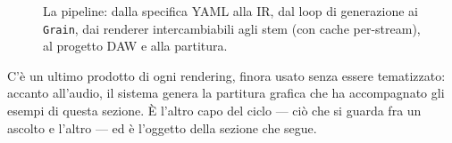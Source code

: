 \begin{figure}[t]
  \centering
  
\caption{La pipeline: dalla specifica YAML alla IR, dal
    loop di generazione ai \texttt{Grain}, dai renderer intercambiabili
    agli stem (con cache per-stream), al progetto DAW e alla partitura.}\label{fig:arch}
\end{figure}

C'è un ultimo prodotto di ogni rendering, finora usato senza essere
tematizzato: accanto all'audio, il sistema genera la partitura grafica
che ha accompagnato gli esempi di questa sezione. È l'altro capo del
ciclo --- ciò che si guarda fra un ascolto e l'altro --- ed è l'oggetto
della sezione che segue.


